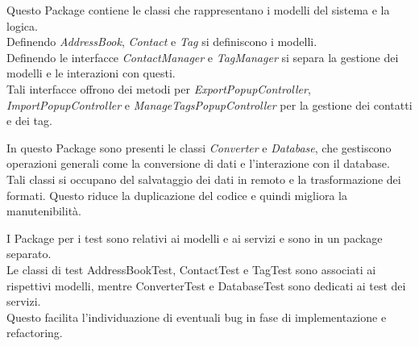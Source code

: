 \begin{tcolorbox}[colback=white,colframe=black!80!white,title=\textbf{Package models}]
	Questo Package contiene le classi che rappresentano i modelli del sistema e la logica. 
	\\Definendo \textit{AddressBook}, \textit{Contact} e \textit{Tag} si definiscono i modelli.
	\\Definendo le interfacce \textit{ContactManager} e \textit{TagManager} si separa la gestione dei modelli e le interazioni con questi. \\
	Tali interfacce offrono dei metodi per \textit{ExportPopupController}, \textit{ImportPopupController} e \textit{ManageTagsPopupController} per la gestione dei contatti e dei tag.
\end{tcolorbox}

\begin{tcolorbox}[colback=white,colframe=black!80!white,title=\textbf{Package services}]
	In questo Package sono presenti le classi \textit{Converter} e \textit{Database}, che gestiscono operazioni generali come la conversione di dati e l'interazione con il database. \\
	Tali classi si occupano del salvataggio dei dati in remoto e la trasformazione dei formati.
	Questo riduce la duplicazione del codice e quindi migliora la manutenibilità.
\end{tcolorbox}

\begin{tcolorbox}[colback=white,colframe=black!80!white,title=\textbf{Package di test}]
	I Package per i test sono relativi ai modelli e ai servizi e sono in un package separato. \\
	Le classi di test AddressBookTest, ContactTest e TagTest sono associati ai rispettivi modelli, mentre ConverterTest e DatabaseTest sono dedicati ai test dei servizi.\\
	Questo facilita l'individuazione di eventuali bug in fase di implementazione e refactoring.
\end{tcolorbox}

\newpage
